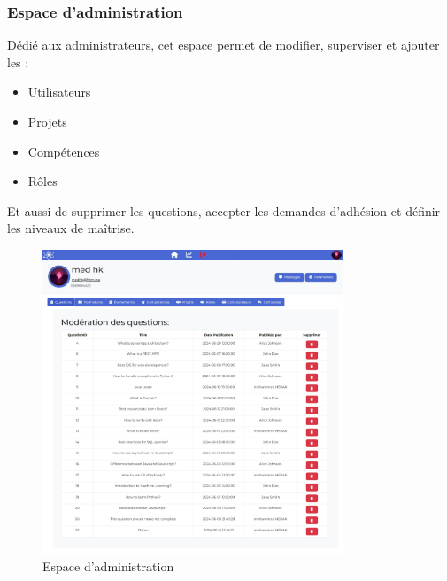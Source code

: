 \documentclass{article}
\begin{document}
                    \subsubsection{Espace d'administration}
                        Dédié aux administrateurs, cet espace permet de modifier, superviser et ajouter les :
                        \begin{itemize}
                            \item Utilisateurs
                            \item Projets
                            \item Compétences
                            \item Rôles
                        \end{itemize}
                        Et aussi de supprimer les questions, accepter les demandes d'adhésion et définir les niveaux de maîtrise.
                        \begin{figure}[h!]
                            \centering
                            \includegraphics[width=0.8\textwidth]{assets/webSite/AdminProfile.jpeg}
                            \caption{Espace d'administration}
                        \end{figure}
                        \FloatBarrier
\end{document}
